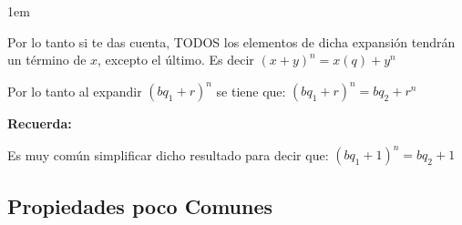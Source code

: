 \documentclass[12pt, fleqn]{report}                             %
\newenvironment{SmallIndentation}[1][0.75em]                    %
    {\begin{adjustwidth}{#1}{}\begin{footnotesize}}                 %
    {\end{footnotesize}\end{adjustwidth}}                           %
\begin{document}
\begin{itemize}
\begin{SmallIndentation}[1em]
                            Por lo tanto si te das cuenta, TODOS los elementos de dicha expansión tendrán 
                            un término de $x$, excepto el último.
                            Es decir $(x+y)^n = x(q) + y^n$

                            Por lo tanto al expandir $(bq_1 + r)^n$ se tiene que:
                            $(bq_1 + r)^n = bq_2 + r^n$

                            \textbf{Recuerda:}

                            Es muy común simplificar dicho resultado para decir que:
                            $(bq_1 + 1)^n = bq_2 + 1$


                    \end{SmallIndentation}

            \end{itemize}



        \clearpage
        \subsection{Propiedades poco Comunes}
\end{document}
